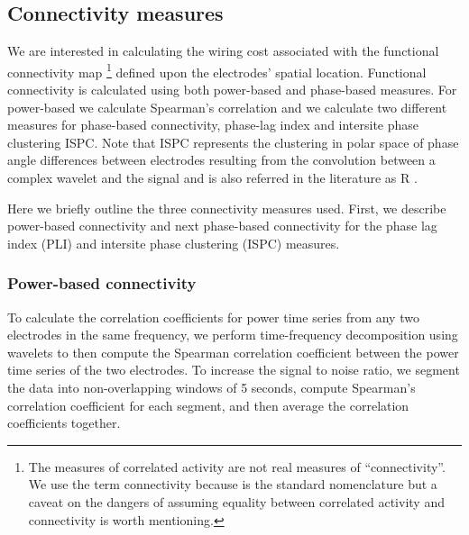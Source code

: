 \documentclass[11pt, onecolumn]{article}
\begin{document}
\subsection{Connectivity measures}
We are interested in calculating the wiring cost associated with the functional connectivity map \footnote{The measures of correlated activity are not real measures of “connectivity”. We use the term connectivity because is the standard nomenclature but a caveat on the dangers of assuming equality between correlated activity and connectivity is worth mentioning.} defined upon the electrodes' spatial location. Functional connectivity is calculated using both power-based and phase-based measures. For power-based we calculate Spearman's correlation and we calculate two different measures for phase-based connectivity, phase-lag index \citep{stam2007phase} and intersite phase clustering ISPC. Note that ISPC represents the clustering in polar space of phase angle differences between electrodes resulting from the convolution between a complex wavelet and the signal and is also referred in the literature as R \citep{cohen2014analyzing}. 

Here we briefly outline the three connectivity measures used. First, we describe power-based connectivity and next phase-based connectivity for the phase lag index (PLI) and intersite phase clustering (ISPC) measures. 

\subsubsection{Power-based connectivity}
To calculate the correlation coefficients for power time series from any two electrodes in the same frequency, we perform time-frequency decomposition using wavelets to then compute the Spearman correlation coefficient between the power time series of the two electrodes. 
To increase the signal to noise ratio, we segment the data into non-overlapping windows of 5 seconds, compute Spearman's correlation coefficient for each segment, and then average the correlation coefficients together. 
\end{document}
